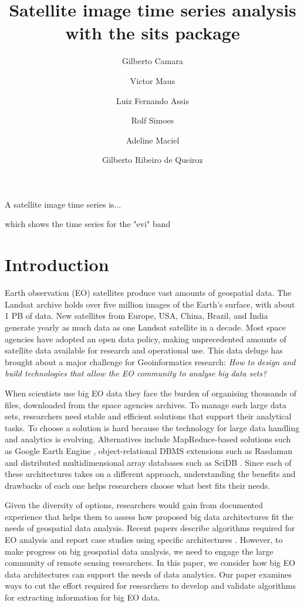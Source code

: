 \documentclass[a4paper, 11pt]{article}
\title{\bfseries Satellite image time series analysis with the sits package}
\date{\vspace{-5ex}}
\author[1]{\normalsize Gilberto Camara}
\author[2]{\normalsize Victor Maus}
\author[1]{\normalsize Luiz Fernando Assis}
\author[1]{\normalsize Rolf Simoes}
\author[1]{\normalsize Adeline Maciel}
\author[1]{\normalsize Gilberto Ribeiro de Queiroz}
\affil[1]{\small Image Processing Division, National Institute for Space Research (INPE), Av dos Astronautas 1758, Sao Jose dos Campos, 12227-001 Brazil. \break
	Email: \{gilberto.camara\}@inpe.br}
\affil[2]{\small International Institute for Applied System Analyis, Schlossplatz 2, 2631 Laxenburg, Austria}
\begin{document}


\selectfont %
\renewcommand*{\bibfont}{\small}
\maketitle



A satellite image time series is...


which shows the time series for the "evi" band
%
\section{Introduction}
\label{sec:introduction}

Earth observation (EO) satellites produce vast amounts of geospatial data. The Landsat archive holds over five million images of the Earth's surface, with about 1 PB of data. New satellites from Europe, USA, China, Brazil, and India generate yearly as much data as one Landsat satellite in a decade. Most space agencies have adopted an open data policy, making unprecedented amounts of satellite data available for research and operational use. This data deluge has brought about a major challenge for Geoinformatics research: \textit{How to design and build technologies that allow the EO community to analyse big data sets?}

When scientists use big EO data they face the burden of organising thousands of files, downloaded from the space agencies archives. To manage such large data sets, researchers need stable and efficient solutions that support their analytical tasks. To choose a solution is hard because the technology for large data handling and analytics is evolving. Alternatives include MapReduce-based solutions such as Google Earth Engine \cite{Gorelick2012}, object-relational DBMS extensions such as Rasdaman \cite{Baumann1998} and  distributed multidimensional array databases such as SciDB \cite{Stonebraker2013}. Since each of these architectures takes on a different approach, understanding the benefits and drawbacks of each one helps researchers choose what best fits their needs.

Given the diversity of options, researchers would gain from documented experience that helps them to assess how proposed big data architectures fit the needs of geospatial data analysis. Recent papers describe algorithms required for EO analysis \cite{Vatsavai2012} \cite{Nativi2015} and report case studies using specific architectures \cite{Planthaber2012}\cite{Krcal2015}. However, to make progress on big geospatial data analysis, we need to engage the large community of remote sensing researchers. In this paper, we consider how big EO data architectures can support the needs of data analytics. Our paper examines ways to cut the effort required for researchers to develop and validate algorithms for extracting information for big EO data.
\end{document}
